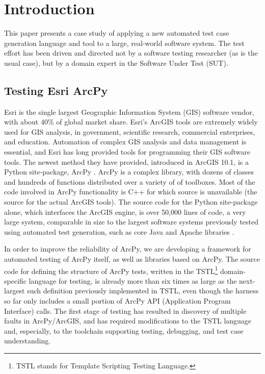 \section{Introduction}

This paper presents a case study of applying a new automated test case
generation language and tool to a large, real-world software system.
The test effort has been driven and directed not by a software testing
researcher (as is the usual case), but by a domain expert in the
Software Under Test (SUT).  

\subsection{Testing Esri ArcPy}


Esri is the single largest Geographic Information System (GIS)
software vendor, with about 40\% of global market share.  Esri's
ArcGIS tools are extremely widely used for GIS analysis, in
government, scientific research, commercial enterprises, and
education.  Automation of complex GIS analysis and data management is
essential, and Esri has long provided tools for programming
their GIS software tools.  The newest method they have provided,
introduced in ArcGIS 10.1, is a Python
site-package, ArcPy \cite{ArcPy}.  ArcPy is a complex library, with
dozens of classes and hundreds of functions distributed over a variety
of of toolboxes.  Most of the code involved in ArcPy functionality is
C++ for which source is unavailable (the source for the actual ArcGIS
tools). The source code for the Python site-package alone, which
interfaces the ArcGIS engine, is over 50,000 lines of code, a very
large system, comparable in size to the largest software systems previously
tested using automated test generation, such as core Java and Apache
libraries \cite{FA11,Pacheco}.

In order to improve the reliability of ArcPy, we are developing a
framework for automated testing of ArcPy itself, as well as libraries
based on ArcPy.  The source code for defining the structure of ArcPy
tests, written in the TSTL\footnote{TSTL stands for Template Scripting
  Testing Language.}\cite{NFM15,ISSTA14,tstl} domain-specific
language \cite{Fow10} for testing, is already more than six times as
large as the next-largest such definition previously implemented in
TSTL, even though the harness so far only includes a small portion of ArcPy
API (Application Program Interface) calls. The first stage of testing has resulted in discovery of
multiple faults in ArcPy/ArcGIS, and has required modifications to the
TSTL language and, especially, to the toolchain supporting testing,
debugging, and test case understanding.

